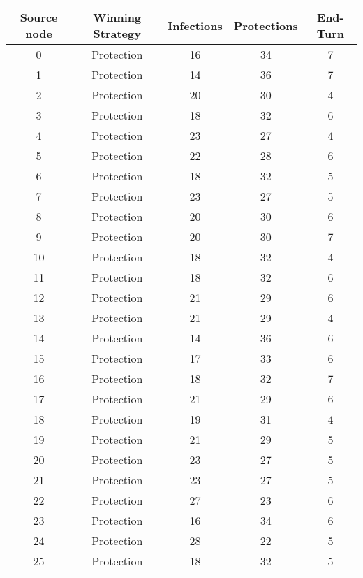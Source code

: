 \documentclass[results.tex]{subfiles}
\begin{document}
\begin{center}
  \begin{tabular}{| c || c | c | c | c |}
    \hline
    {\bfseries Source node} & {\bfseries Winning Strategy} & {\bfseries Infections} & {\bfseries Protections} & {\bfseries End-Turn} \\  %
    \hline\hline
    0 & Protection & 16 & 34 & 7 \\ 
    \hline
    1 & Protection & 14 & 36 & 7 \\ 
    \hline
    2 & Protection & 20 & 30 & 4 \\ 
    \hline
    3 & Protection & 18 & 32 & 6 \\ 
    \hline
    4 & Protection & 23 & 27 & 4 \\ 
    \hline
    5 & Protection & 22 & 28 & 6 \\ 
    \hline
    6 & Protection & 18 & 32 & 5 \\ 
    \hline
    7 & Protection & 23 & 27 & 5 \\ 
    \hline
    8 & Protection & 20 & 30 & 6 \\ 
    \hline
    9 & Protection & 20 & 30 & 7 \\ 
    \hline
    10 & Protection & 18 & 32 & 4 \\ 
    \hline
    11 & Protection & 18 & 32 & 6 \\ 
    \hline
    12 & Protection & 21 & 29 & 6 \\ 
    \hline
    13 & Protection & 21 & 29 & 4 \\ 
    \hline
    14 & Protection & 14 & 36 & 6 \\ 
    \hline
    15 & Protection & 17 & 33 & 6 \\ 
    \hline
    16 & Protection & 18 & 32 & 7 \\ 
    \hline
    17 & Protection & 21 & 29 & 6 \\ 
    \hline
    18 & Protection & 19 & 31 & 4 \\ 
    \hline
    19 & Protection & 21 & 29 & 5 \\ 
    \hline
    20 & Protection & 23 & 27 & 5 \\ 
    \hline
    21 & Protection & 23 & 27 & 5 \\ 
    \hline
    22 & Protection & 27 & 23 & 6 \\ 
    \hline
    23 & Protection & 16 & 34 & 6 \\ 
    \hline
    24 & Protection & 28 & 22 & 5 \\ 
    \hline
    25 & Protection & 18 & 32 & 5 \\ 

\end{tabular}
\end{center}
\end{document}
